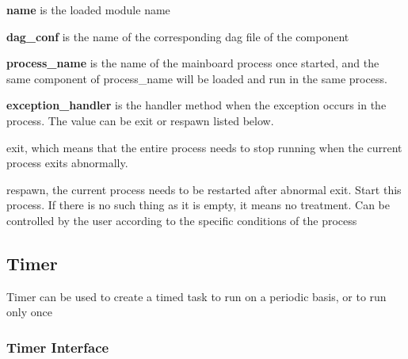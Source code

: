 {\ttfamily 
\begin{DoxyItemize}
\item {\bfseries name} is the loaded module name
\item {\bfseries dag\-\_\-conf} is the name of the corresponding dag file of the component
\item {\bfseries process\-\_\-name} is the name of the mainboard process once started, and the same component of process\-\_\-name will be loaded and run in the same process.
\item {\bfseries exception\-\_\-handler} is the handler method when the exception occurs in the process. The value can be exit or respawn listed below.
\begin{DoxyItemize}
\item exit, which means that the entire process needs to stop running when the current process exits abnormally.
\item respawn, the current process needs to be restarted after abnormal exit. Start this process. If there is no such thing as it is empty, it means no treatment. Can be controlled by the user according to the specific conditions of the process
\end{DoxyItemize}
\end{DoxyItemize}}

{\ttfamily \subsection*{Timer}}

{\ttfamily }

{\ttfamily Timer can be used to create a timed task to run on a periodic basis, or to run only once}

{\ttfamily \subsubsection*{Timer Interface}}

